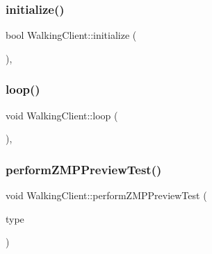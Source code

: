 \subsubsection{\texorpdfstring{initialize()}{initialize()}}
{\footnotesize\ttfamily bool Walking\+Client\+::initialize (\begin{DoxyParamCaption}{ }\end{DoxyParamCaption})\hspace{0.3cm}{\ttfamily [protected]}, {\ttfamily [virtual]}}

\hypertarget{classWalkingClient_afd997bb00534c57fe1b0d5f37f207386}{}\label{classWalkingClient_afd997bb00534c57fe1b0d5f37f207386} 
\subsubsection{\texorpdfstring{loop()}{loop()}}
{\footnotesize\ttfamily void Walking\+Client\+::loop (\begin{DoxyParamCaption}{ }\end{DoxyParamCaption})\hspace{0.3cm}{\ttfamily [protected]}, {\ttfamily [virtual]}}

\hypertarget{classWalkingClient_a3b1217b7fa17f76f162be0e12e419d96}{}\label{classWalkingClient_a3b1217b7fa17f76f162be0e12e419d96} 
\subsubsection{\texorpdfstring{perform\+Z\+M\+P\+Preview\+Test()}{performZMPPreviewTest()}}
{\footnotesize\ttfamily void Walking\+Client\+::perform\+Z\+M\+P\+Preview\+Test (\begin{DoxyParamCaption}\item[{\hyperlink{WalkingClient_8h_afc01479a47f5a87462a54b6a9e11fffa}{Zmp\+Test\+Type}}]{type }\end{DoxyParamCaption})}

\hypertarget{classWalkingClient_ae3c259f7615c85ce53a413f6e7ab4b76}{}\label{classWalkingClient_ae3c259f7615c85ce53a413f6e7ab4b76} 
